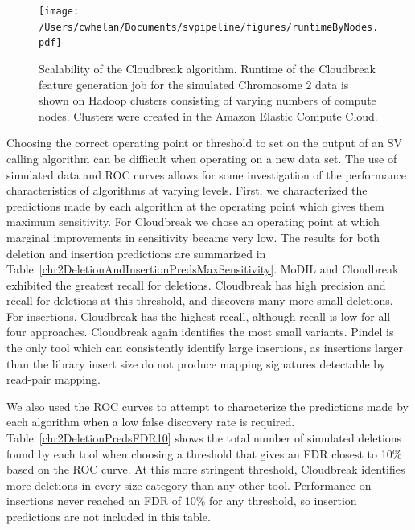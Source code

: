 \begin{figure}
\centering
\texttt{[image: /Users/cwhelan/Documents/svpipeline/figures/runtimeByNodes.pdf]}
\caption{Scalability of the Cloudbreak algorithm. Runtime of the Cloudbreak feature generation job for the simulated Chromosome 2 data is shown on Hadoop clusters consisting of varying numbers of compute nodes. Clusters were created in the Amazon Elastic Compute Cloud.}
\label{scalability}
\end{figure}

Choosing the correct operating point or threshold to set on the output of an SV calling algorithm can be difficult when operating on a new data set. The use of simulated data and ROC curves allows for some investigation of the performance characteristics of algorithms at varying levels. First, we characterized the predictions made by each algorithm at the operating point which gives them maximum sensitivity. For Cloudbreak we chose an operating point at which marginal improvements in sensitivity became very low. The results for both deletion and insertion predictions are summarized in Table~\ref{chr2DeletionAndInsertionPredsMaxSensitivity}. MoDIL and Cloudbreak exhibited the greatest recall for deletions. Cloudbreak has high precision and recall for deletions at this threshold, and discovers many more small deletions. For insertions, Cloudbreak has the highest recall, although recall is low for all four approaches. Cloudbreak again identifies the most small variants. Pindel is the only tool which can consistently identify large insertions, as insertions larger than the library insert size do not produce mapping signatures detectable by read-pair mapping. 

We also used the ROC curves to attempt to characterize the predictions made by each algorithm when a low false discovery rate is required. Table~\ref{chr2DeletionPredsFDR10} shows the total number of simulated deletions found by each tool when choosing a threshold that gives an FDR closest to 10\% based on the ROC curve. At this more stringent threshold, Cloudbreak identifies more deletions in every size category than any other tool. Performance on insertions never reached an FDR of 10\% for any threshold, so insertion predictions are not included in this table. 

